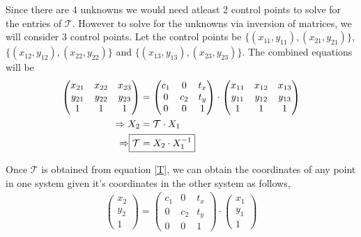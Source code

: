 \documentclass[12pt]{article}
\begin{document}
    Since there are 4 unknowns we would need atleast 2 control points to solve for the entries of $\mathcal{T}$. However to 
    solve for the unknowns via inversion of matrices, we will consider 3 control points. Let
    the control points be $\{(x_{11},y_{11}),(x_{21},y_{21})\}$, $\{(x_{12},y_{12}),(x_{22},y_{22})\}$ and 
    $\{(x_{13},y_{13}),(x_{23},y_{23})\}$. The combined equations will be
    \begin{align}
        \begin{pmatrix}
            x_{21} & x_{22} & x_{23} \\
            y_{21} & y_{22} & y_{23} \\
            1 & 1 & 1
        \end{pmatrix}
        &= 
        \begin{pmatrix}
            c_{1} & 0 & t_{x} \\
            0  & c_{2} & t_{y} \\
            0 & 0 & 1
        \end{pmatrix} \cdot
        \begin{pmatrix}
            x_{11} & x_{12} & x_{13} \\
            y_{11} & y_{12} & y_{13} \\
            1 & 1 & 1
        \end{pmatrix} \nonumber \\
        \Rightarrow X_{2} &= \mathcal{T} \cdot X_{1} \nonumber \\
        \Rightarrow \label{T} \Aboxed{\mathcal{T} &= X_{2}\cdot X_{1}^{-1}}
    \end{align}

    Once $\mathcal{T}$ is obtained from equation \ref{T}, we can obtain the coordinates of any point in one system
    given it's coordinates in the other system as follows, 
    \begin{align*}
        \begin{pmatrix}
            x_{2} \\
            y_{2} \\
            1
        \end{pmatrix}
        = 
        \begin{pmatrix}
            c_{1} & 0 & t_{x} \\
            0  & c_{2} & t_{y} \\
            0 & 0 & 1
        \end{pmatrix} \cdot
        \begin{pmatrix}
            x_{1} \\
            y_{1} \\
            1
        \end{pmatrix}
    \end{align*}
    \clearpage
\end{document}
